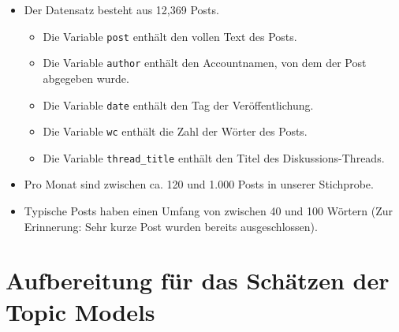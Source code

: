 \documentclass[
]{book}
\providecommand{\tightlist}{%
  \setlength{\itemsep}{0pt}\setlength{\parskip}{0pt}}
\begin{document}
\begin{itemize}
\tightlist
\item
  Der Datensatz besteht aus 12,369 Posts.

  \begin{itemize}
  \tightlist
  \item
    Die Variable \texttt{post} enthält den vollen Text des Posts.
  \item
    Die Variable \texttt{author} enthält den Accountnamen, von dem der Post abgegeben wurde.
  \item
    Die Variable \texttt{date} enthält den Tag der Veröffentlichung.
  \item
    Die Variable \texttt{wc} enthält die Zahl der Wörter des Posts.
  \item
    Die Variable \texttt{thread\_title} enthält den Titel des Diskussions-Threads.
  \end{itemize}
\item
  Pro Monat sind zwischen ca. 120 und 1.000 Posts in unserer Stichprobe.
\item
  Typische Posts haben einen Umfang von zwischen 40 und 100 Wörtern (Zur Erinnerung: Sehr kurze Post wurden bereits ausgeschlossen).
\end{itemize}

\hypertarget{aufbereitung-fuxfcr-das-schuxe4tzen-der-topic-models}{%
\section{Aufbereitung für das Schätzen der Topic Models}\label{aufbereitung-fuxfcr-das-schuxe4tzen-der-topic-models}}
\end{document}
